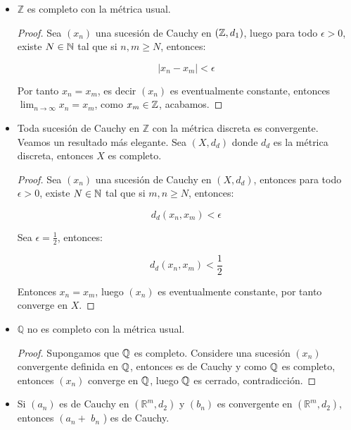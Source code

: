 \begin{itemize}[leftmargin=*]
    
    \item $\mathbb{Z}$ es completo con la métrica usual.\\

    \begin{proof}
        Sea $(x_n)$ una sucesión de Cauchy en $(\mathbb{Z},d_1)$, luego para todo $\epsilon>0$, existe $N\in \mathbb{N}$ tal que si $n,m\geq N$, entonces:

        $$|x_n-x_m|<\epsilon$$

        Por tanto $x_n=x_m$, es decir $(x_n)$ es eventualmente constante, entonces $\lim_{n \to \infty} x_n=x_m$, como $x_m \in \mathbb{Z}$, acabamos.
    \end{proof}

    \item Toda sucesión de Cauchy en $\mathbb{Z}$ con la métrica discreta es convergente.\\
    
    Veamos un resultado más elegante. Sea $(X,d_d)$ donde $d_d$ es la métrica discreta, entonces $X$ es completo.\\

    \begin{proof}
        Sea $(x_n)$ una sucesión de Cauchy en $(X,d_d)$, entonces para todo $\epsilon>0$, existe $N\in\mathbb{N}$ tal que si $m,n\geq N$, entonces:

        $$d_d(x_n,x_m)<\epsilon$$

        Sea $\epsilon=\frac{1}{2}$, entonces:

        $$d_d(x_n,x_m)<\frac{1}{2}$$

        Entonces $x_n=x_m$, luego $(x_n)$ es eventualmente constante, por tanto converge en $X$.
    \end{proof}

    \item $\mathbb{Q}$ no es completo con la métrica usual.\\

    \begin{proof}
        Supongamos que $\mathbb{Q}$ es completo. Considere una sucesión $(x_n)$ convergente definida en $\mathbb{Q}$, entonces es de Cauchy y como $\mathbb{Q}$ es completo, entonces $(x_n)$ converge en $\mathbb{Q}$, luego $\mathbb{Q}$ es cerrado, contradicción.
    \end{proof} 

    \item  Si $\left(a_n\right)$ es de Cauchy en $\left(\mathbb{R}^m, d_2\right)$ y $\left(b_n\right)$ es convergente en $\left(\mathbb{R}^m, d_2\right)$, entonces $\left(a_n+\right.$ $b_n$ ) es de Cauchy.\\


\end{itemize}
